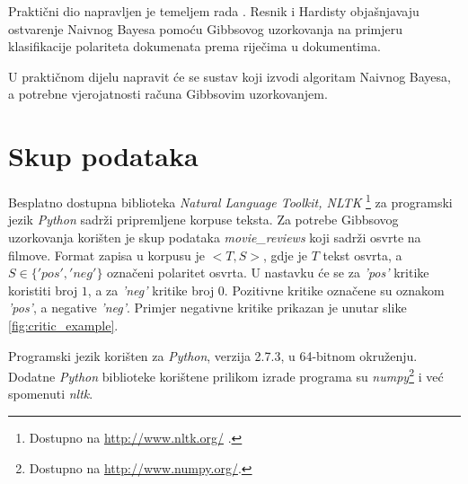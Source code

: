 Praktični dio napravljen je temeljem rada \citep{resnik2010gibbs}. Resnik i Hardisty objašnjavaju ostvarenje Naivnog Bayesa  pomoću Gibbsovog uzorkovanja na primjeru klasifikacije polariteta dokumenata prema riječima u dokumentima. 

U praktičnom dijelu napravit će se sustav koji izvodi algoritam Naivnog Bayesa, a potrebne vjerojatnosti računa Gibbsovim uzorkovanjem. 

\section{Skup podataka}

Besplatno dostupna biblioteka \textit{Natural Language Toolkit, NLTK} \footnote{Dostupno na \url{http://www.nltk.org/} .} za programski jezik \textit{Python} sadrži pripremljene korpuse teksta. 
Za potrebe Gibbsovog uzorkovanja korišten je skup podataka \textit{movie\_reviews} koji sadrži osvrte na filmove. Format zapisa u korpusu je $<T, S>$, gdje je $T$ tekst osvrta, a $S \in \{'pos', 'neg'\}$ označeni polaritet osvrta. U nastavku će se za \textit{'pos'} kritike koristiti broj $1$, a za \textit{'neg'} kritike broj $0$. Pozitivne kritike označene su oznakom \textit{'pos'}, a negative \textit{'neg'}. Primjer negativne kritike prikazan je unutar slike \ref{fig:critic_example}.

Programski jezik korišten za \textit{Python}, verzija 2.7.3, u 64-bitnom okruženju. Dodatne \textit{Python} biblioteke korištene prilikom izrade programa su \textit{numpy}\footnote{Dostupno na \url{http://www.numpy.org/}.} i već spomenuti \textit{nltk}.

